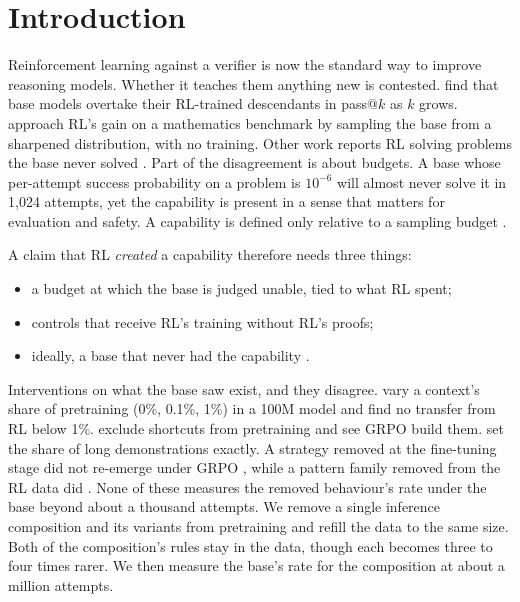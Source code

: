 \section{Introduction}
\label{sec:intro}

Reinforcement learning against a verifier is now the standard way to improve reasoning models. Whether it teaches them
anything new is contested. \citet{yue2025doesrl} find that base models overtake their RL-trained descendants in
pass@$k$ as $k$ grows. \citet{karan2025power} approach RL's gain on a mathematics benchmark by sampling the base from a
sharpened distribution, with no training. Other work reports RL solving problems the base never solved
\citep{abdulsalam2026rewrite,liu2025prorl}. Part of the disagreement is about budgets. A base whose per-attempt success
probability on a problem is $10^{-6}$ will almost never solve it in 1,024 attempts, yet the capability is present in a
sense that matters for evaluation and safety. A capability is defined only relative to a sampling budget
\citep{li2026elicitcreate,brown2024monkeys}.

A claim that RL \emph{created} a capability therefore needs three things:
\begin{itemize}
\item a budget at which the base is judged unable, tied to what RL spent;
\item controls that receive RL's training without RL's proofs;
\item ideally, a base that never had the capability \citep{jain2023mechanistically,deeb2024unlearning}.
\end{itemize}
Interventions on what the base saw exist, and they disagree. \citet{zhang2025interplay} vary a context's share of
pretraining (0\%, 0.1\%, 1\%) in a 100M model and find no transfer from RL below 1\%. \citet{abdulsalam2026rewrite}
exclude shortcuts from pretraining and see GRPO build them. \citet{tsilivis2025rlntp} set the share of long
demonstrations exactly. A strategy removed at the fine-tuning stage did not re-emerge under GRPO
\citep{krishnamurthy2026select}, while a pattern family removed from the RL data did \citep{park2025countdown}. None of
these measures the removed behaviour's rate under the base beyond about a thousand attempts. We remove a single inference composition and its variants from pretraining
and refill the data to the same size. Both of the composition's rules stay in the data, though each becomes three to four
times rarer. We then measure the base's rate for the composition at about a million attempts.

